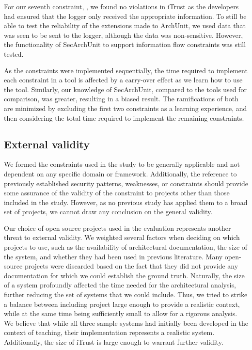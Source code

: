 For our seventh constraint, , we found no violations in iTrust as the developers had ensured that the logger only received the appropriate information. To still be able to test the reliability of the extensions made to ArchUnit, we used data that was seen to be sent to the logger, although the data was non-sensitive. However, the functionality of SecArchUnit to support information flow constraints was still tested. 

As the constraints were implemented sequentially, the time required to implement each constraint in a tool is affected by a carry-over effect as we learn how to use the tool. Similarly, our knowledge of SecArchUnit, compared to the tools used for comparison, was greater, resulting in a biased result. The ramifications of both are minimized by excluding the first two constraints as a learning experience, and then considering the total time required to implement the remaining constraints.

\subsection{External validity}

We formed the constraints used in the study to be generally applicable and not dependent on any specific domain or framework. Additionally, the reference to previously established security patterns, weaknesses, or constraints should provide some assurance of the validity of the constraint to projects other than those included in the study. However, as no previous study has applied them to a broad set of projects, we cannot draw any conclusion on the general validity. 

Our choice of open source projects used in the evaluation represents another threat to external validity. We weighted several factors when deciding on which projects to use, such as the availability of architectural documentation, the size of the system, and whether they had been used in previous literature. Many open-source projects were discarded based on the fact that they did not provide any documentation for which we could establish the ground truth. Naturally, the size of a system profoundly affected the time needed for the architectural analysis, further reducing the set of systems that we could include. Thus, we tried to strike a balance between including project large enough to provide a realistic context, while at the same time being sufficiently small to allow for a rigorous analysis. We believe that while all three sample systems had initially been developed in the context of teaching, their implementation represents a realistic system. Additionally, the size of iTrust is large enough to warrant further validity.

